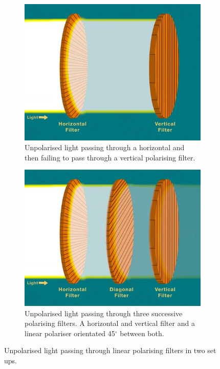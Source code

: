 \begin{figure}[H]
  \centering
  \begin{subfigure}[b]{0.44\linewidth}
    \includegraphics[width=\linewidth]{images/2 polariser.jpg}
    \caption{Unpolarised light passing through a horizontal and then failing to pass through a vertical polarising filter. }\label{fig:2 polarise}
  \end{subfigure}
  \begin{subfigure}[b]{0.44\linewidth}
    \includegraphics[width=\linewidth]{images/3 polariser.jpg}
    \caption{Unpolarised light passing through three successive polarising filters. A horizontal and vertical filter and a linear polariser orientated 45$^\circ$ between both. }\label{fig:3 polarise}
  \end{subfigure}
  \caption{Unpolarised light passing through linear polarising filters in two set ups. \cite{noauthor_whatCal_nodate}}
  \label{fig:polarisers}
\end{figure}

